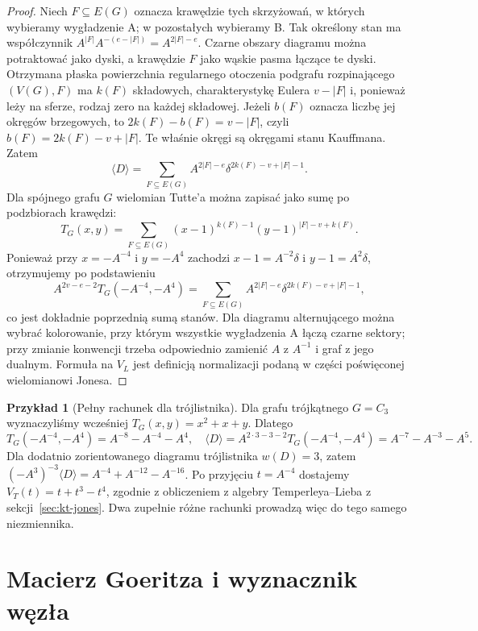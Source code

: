 \documentclass[11pt,a4paper]{report}
\numberwithin{equation}{section}
\theoremstyle{plain}
\theoremstyle{definition}
\newtheorem{przyklad}[twierdzenie]{Przykład}
\theoremstyle{remark}
\begin{document}
\begin{proof}
Niech $F\subseteq E(G)$ oznacza krawędzie tych skrzyżowań,
w których wybieramy wygładzenie A; w pozostałych
wybieramy B. Tak określony stan ma współczynnik
$A^{|F|}A^{-(e-|F|)}=A^{2|F|-e}$.
Czarne obszary diagramu można potraktować jako dyski,
a krawędzie $F$ jako wąskie pasma łączące te dyski.
Otrzymana płaska powierzchnia regularnego otoczenia
podgrafu rozpinającego $(V(G),F)$ ma $k(F)$ składowych,
charakterystykę Eulera $v-|F|$ i, ponieważ leży na
sferze, rodzaj zero na każdej składowej. Jeżeli
$b(F)$ oznacza liczbę jej okręgów brzegowych, to
$2k(F)-b(F)=v-|F|$, czyli
$b(F)=2k(F)-v+|F|$.
Te właśnie okręgi są okręgami stanu Kauffmana.
Zatem
\[
\langle D\rangle=
\sum_{F\subseteq E(G)}
 A^{2|F|-e}\delta^{2k(F)-v+|F|-1}.
\]
Dla spójnego grafu $G$ wielomian Tutte'a można
zapisać jako sumę po podzbiorach krawędzi:
\[
T_G(x,y)=\sum_{F\subseteq E(G)}
(x-1)^{k(F)-1}(y-1)^{|F|-v+k(F)}.
\]
Ponieważ przy $x=-A^{-4}$ i $y=-A^4$ zachodzi
$x-1=A^{-2}\delta$ i $y-1=A^2\delta$,
otrzymujemy po podstawieniu
\[
A^{2v-e-2}T_G(-A^{-4},-A^4)
=\sum_{F\subseteq E(G)}
 A^{2|F|-e}\delta^{2k(F)-v+|F|-1},
\]
co jest dokładnie poprzednią sumą stanów.
Dla diagramu alternującego można wybrać kolorowanie,
przy którym wszystkie wygładzenia A łączą czarne
sektory; przy zmianie konwencji trzeba odpowiednio
zamienić $A$ z $A^{-1}$ i graf z jego dualnym.
Formuła na $V_L$ jest definicją normalizacji
podaną w części poświęconej wielomianowi Jonesa.
\end{proof}

\begin{przyklad}[Pełny rachunek dla trójlistnika]
Dla grafu trójkątnego $G=C_3$ wyznaczyliśmy wcześniej
$T_G(x,y)=x^2+x+y$. Dlatego
\[
T_G(-A^{-4},-A^4)=A^{-8}-A^{-4}-A^4,
\quad
\langle D\rangle=A^{2\cdot3-3-2}T_G(-A^{-4},-A^4)
=A^{-7}-A^{-3}-A^5.
\]
Dla dodatnio zorientowanego diagramu trójlistnika
$w(D)=3$, zatem
$(-A^3)^{-3}\langle D\rangle
=A^{-4}+A^{-12}-A^{-16}$.
Po przyjęciu $t=A^{-4}$ dostajemy
$V_T(t)=t+t^3-t^4$, zgodnie z obliczeniem
z algebry Temperleya--Lieba z sekcji~\ref{sec:kt-jones}.
Dwa zupełnie różne
rachunki prowadzą więc do tego samego niezmiennika.
\end{przyklad}

\section{Macierz Goeritza i wyznacznik węzła}
\label{sec:tg-goeritz}
\end{document}
